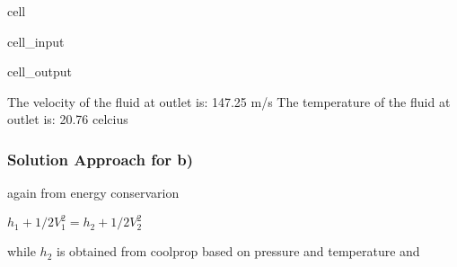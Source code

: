 \documentclass[letterpaper,10pt,english]{jupyterBook}
\begin{document}
\begin{sphinxuseclass}{cell}
\begin{sphinxVerbatimInput}
\begin{sphinxuseclass}{cell_input}
\begin{sphinxVerbatim}[commandchars=\\\{\}]
       
       
  
  
\end{sphinxVerbatim}

\end{sphinxuseclass}\end{sphinxVerbatimInput}
\begin{sphinxVerbatimOutput}

\begin{sphinxuseclass}{cell_output}
\begin{sphinxVerbatim}[commandchars=\\\{\}]
The velocity of the fluid at outlet is: 147.25 m/s
The temperature of the fluid at outlet is: \PYGZhy{}20.76 celcius
\end{sphinxVerbatim}

\end{sphinxuseclass}\end{sphinxVerbatimOutput}

\end{sphinxuseclass}

\subsubsection{Solution Approach for b)}
\label{\detokenize{notebooks/Chapter5/CH5-Q9:id1}}
\sphinxAtStartPar
again from energy conservarion

\sphinxAtStartPar
\(h_1+1/2V_1^2=h_2+1/2V_2^2\)

\sphinxAtStartPar
while \(h_2\) is obtained from coolprop based on pressure and temperature and
\end{document}
